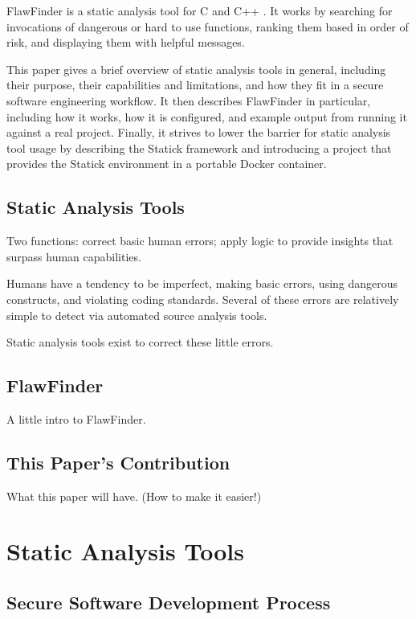 \documentclass[journal]{IEEEtran}
\begin{document}
FlawFinder is a static analysis tool for C and C++ \cite{flawfinder}. It works by searching for
invocations of dangerous or hard to use functions, ranking them based in order of risk, and
displaying them with helpful messages.

This paper gives a brief overview of static analysis tools in general, including their purpose,
their capabilities and limitations, and how they fit in a secure software engineering workflow. It
then describes FlawFinder in particular, including how it works, how it is configured, and example
output from running it against a real project. Finally, it strives to lower the barrier for static
analysis tool usage by describing the Statick framework and introducing a project that provides the
Statick environment in a portable Docker container.

\subsection{Static Analysis Tools}
Two functions: correct basic human errors; apply logic to provide insights that surpass human
capabilities.

Humans have a tendency to be imperfect, making basic errors, using dangerous constructs, and
violating coding standards. Several of these errors are relatively simple to detect via automated
source analysis tools.

Static analysis tools exist to correct these little errors.

\subsection{FlawFinder}
A little intro to FlawFinder.

\subsection{This Paper's Contribution}
What this paper will have. (How to make it easier!)


\section{Static Analysis Tools}

\subsection{Secure Software Development Process}
\end{document}
